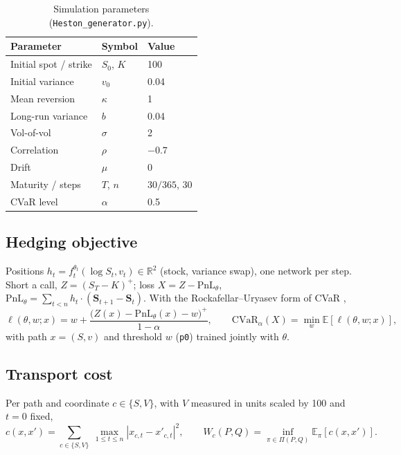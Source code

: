 \documentclass[11pt]{article}
\newif\ifshowguides
\newcommand{\guide}[1]{\ifshowguides
  \par\smallskip\noindent\fcolorbox{gray!50}{gray!6}{\parbox{\dimexpr\linewidth-2\fboxsep-2\fboxrule}{\small\itshape\color{gray!80!black}#1}}\par\smallskip\fi}
\newcommand{\E}{\mathbb{E}}
\newcommand{\cvar}{\mathrm{CVaR}}
\newcommand{\PnL}{\mathrm{PnL}}
\begin{document}
\begin{table}[htbp]\centering
\caption{Simulation parameters (\texttt{Heston\_generator.py}).}\label{tab:params}
\begin{tabular}{lll}\toprule
Parameter & Symbol & Value\\\midrule
Initial spot / strike & $S_0$, $K$ & 100\\
Initial variance & $v_0$ & 0.04\\
Mean reversion & $\kappa$ & 1\\
Long-run variance & $b$ & 0.04\\
Vol-of-vol & $\sigma$ & 2\\
Correlation & $\rho$ & $-0.7$\\
Drift & $\mu$ & 0\\
Maturity / steps & $T$, $n$ & $30/365$, 30\\
CVaR level & $\alpha$ & 0.5\\\bottomrule
\end{tabular}
\end{table}

\subsection{Hedging objective}
Positions $h_t=f^{\theta_t}_t(\log S_t, v_t)\in\mathbb{R}^2$ (stock, variance swap), one network per
step. Short a call, $Z=(S_T-K)^+$; loss $X=Z-\PnL_\theta$, $\PnL_\theta=\sum_{t<n}h_t\cdot(\bm S_{t+1}-\bm S_t)$.
With the Rockafellar--Uryasev form of CVaR \cite{rockafellar2000},
\begin{equation}\label{eq:loss}
\ell(\theta,w;x)=w+\frac{\big(Z(x)-\PnL_\theta(x)-w\big)^+}{1-\alpha},\qquad
\cvar_\alpha(X)=\min_w \E[\ell(\theta,w;x)],
\end{equation}
with path $x=(S,v)$ and threshold $w$ (\texttt{p0}) trained jointly with $\theta$.

\subsection{Transport cost}
Per path and coordinate $c\in\{S,V\}$, with $V$ measured in units scaled by 100 and $t=0$ fixed,
\begin{equation}\label{eq:cost}
c(x,x')=\sum_{c\in\{S,V\}}\ \max_{1\le t\le n}|x_{c,t}-x'_{c,t}|^2,
\qquad W_c(P,Q)=\inf_{\pi\in\Pi(P,Q)}\E_\pi[c(x,x')] .
\end{equation}
\guide{Stress that BOTH formulations use exactly this cost; the only difference is how it is
bounded.}
\end{document}

